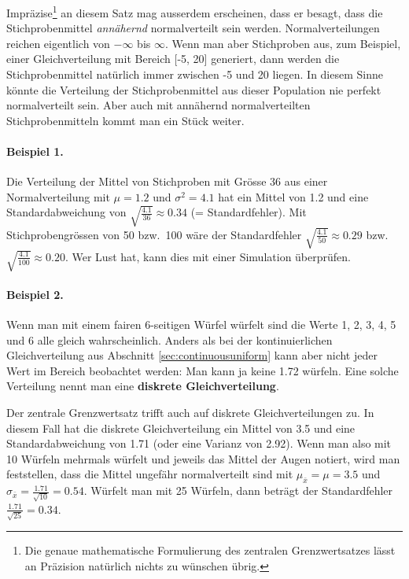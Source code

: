 \documentclass[oneside, 10pt]{book}\usepackage[]{graphicx}\usepackage[]{xcolor}
\begin{document}
Impräzise\footnote{Die genaue
mathematische Formulierung des zentralen Grenzwertsatzes
lässt an Präzision natürlich nichts zu wünschen übrig.} 
an diesem Satz mag ausserdem erscheinen,
dass er besagt,
dass die Stichprobenmittel \emph{annähernd}
normalverteilt sein werden. Normalverteilungen
reichen eigentlich von $-\infty$ bis $\infty$.
Wenn man aber Stichproben aus, zum Beispiel,
einer Gleichverteilung mit Bereich [-5, 20]
generiert, dann werden die Stichprobenmittel
natürlich immer zwischen -5 und 20 liegen.
In diesem Sinne könnte die Verteilung der
Stichprobenmittel aus dieser Population nie
perfekt normalverteilt sein. Aber auch mit
annähernd normalverteilten Stichprobenmitteln
kommt man ein Stück weiter.

\paragraph{Beispiel 1.}
Die Verteilung der Mittel von Stichproben
mit Grösse 36 aus einer Normalverteilung
mit $\mu = 1.2$ und $\sigma^2 = 4.1$ hat
ein Mittel von 1.2 und eine Standardabweichung
von $\sqrt{\frac{4.1}{36}} \approx 0.34$ (= Standardfehler).
Mit Stichprobengrössen von 50 bzw.\ 100
wäre der Standardfehler
$\sqrt{\frac{4.1}{50}} \approx 0.29$
bzw.\
$\sqrt{\frac{4.1}{100}} \approx 0.20$.
Wer Lust hat, kann dies mit einer Simulation überprüfen.

\paragraph{Beispiel 2.}
Wenn man mit einem fairen 6-seitigen Würfel
würfelt sind die Werte 1, 2, 3, 4, 5 und 6
alle gleich wahrscheinlich. Anders als bei
der kontinuierlichen Gleichverteilung
aus Abschnitt \ref{sec:continuousuniform}
kann aber nicht jeder Wert im Bereich beobachtet
werden: Man kann ja keine 1.72 würfeln.
Eine solche Verteilung nennt man eine
\textbf{diskrete Gleichverteilung}.

Der zentrale Grenzwertsatz trifft auch auf
diskrete Gleichverteilungen zu. In diesem
Fall hat die diskrete Gleichverteilung ein
Mittel von 3.5 und eine Standardabweichung
von 1.71 (oder eine Varianz von 2.92).
Wenn man also mit 10 Würfeln mehrmals würfelt
und jeweils das Mittel der Augen notiert,
wird man feststellen, dass die Mittel
ungefähr normalverteilt sind mit $\mu_{\bar{x}} = \mu = 3.5$
und $\sigma_{\bar{x}} = \frac{1.71}{\sqrt{10}} = 0.54$.
Würfelt man mit 25 Würfeln, dann beträgt
der Standardfehler $\frac{1.71}{\sqrt{25}} = 0.34$.
\end{document}
